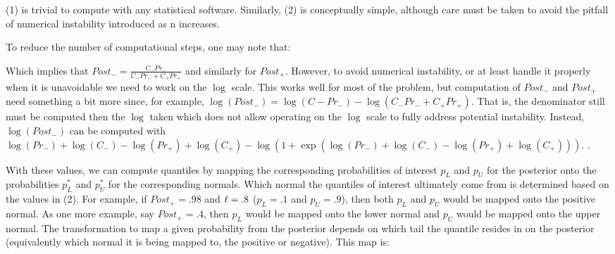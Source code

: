 (1) is trivial to compute with any statistical software. Similarly, (2) is conceptually simple, although care must be taken to avoid the pitfall of numerical instability introduced as n increases.  

To reduce the number of computational steps, one may note that:


Which implies that $Post_- = \frac{C_{-} Pr_{-}}{C_{-} Pr_{-} + C_{+} Pr_{+}}$ and similarly for $Post_+$. However, to avoid numerical instability, or at least handle it properly when it is unavoidable we need to work on the $\log$ scale. This works well for most of the problem, but computation of $Post_-$ and $Post_+$ need something a bit more since, for example, $\log(Post_-) = \log(C{-}Pr_{-}) - \log(C_{-} Pr_{-} + C_{+} Pr_{+})$. That is, the denominator still must be computed then the $\log$ taken which does not allow operating on the $\log$ scale to fully address potential instability. Instead, $\log(Post_-)$ can be computed with $\log(Pr_-) + \log(C_-) -  \log(Pr_+) + \log(C_+) - \log(1 + \exp(\log(Pr_-) + \log(C_-) -  \log(Pr_+) + \log(C_+)))$. .

With these values, we can compute quantiles by mapping the corresponding probabilities of interest $p_{L}$ and $p_{U}$ for the posterior onto the probabilities $p^*_{L}$ and $p^*_{U}$ for the corresponding normals. Which normal the quantiles of interest ultimately come from is determined based on the values in (2). For example, if $Post_{+} = .98$ and $\ell = .8$ ($p_{L} = .1$ and $p_{U} = .9$), then both $p_{L}$ and $p_{U}$ would be mapped onto the positive normal. As one more example, say $Post_{+} = .4$, then $p_{L}$ would be mapped onto the lower normal and $p_{U}$ would be mapped onto the upper normal. The transformation to map a given probability from the posterior depends on which tail the quantile resides in on the posterior (equivalently which normal it is being mapped to, the positive or negative). This map is:

 
